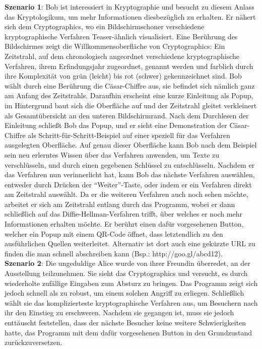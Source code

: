 \documentclass{article}
\begin{document}
\textbf{Szenario 1}:
Bob ist interessiert in Kryptographie und besucht zu diesem Anlass das Kryptologikum, um mehr Informationen diesbezüglich zu erhalten. Er nähert sich dem Cryptographics, wo ein Bildschirmschoner verschiedene kryptographische Verfahren Teaser-ähnlich visualisiert. Eine Berührung des Bildschirmes zeigt die Willkommensoberfläche von Cryptographics: Ein Zeitstrahl, auf dem chronologisch angeordnet verschiedene kryptographische Verfahren, ihrem Erfindungsjahr zugeordnet, genannt werden und farblich durch ihre Komplexität von grün (leicht) bis rot (schwer) gekennzeichnet sind. Bob wählt durch eine Berührung die Cäsar-Chiffre aus, sie befindet sich nämlich ganz am Anfang des Zeitstrahls. Daraufhin erscheint eine kurze Einleitung als Popup, im Hintergrund baut sich die Oberfläche auf und der Zeitstrahl gleitet verkleinert als Gesamtübersicht an den unteren Bildschirmrand. Nach dem Durchlesen der Einleitung schließt Bob das Popup, und er sieht eine Demonstration der Cäsar-Chiffre als Schritt-für-Schritt-Beispiel auf 
einer speziell für das Verfahren ausgelegten Oberfläche. Auf genau dieser Oberfläche kann Bob nach dem Beispiel sein neu erlerntes Wissen über das Verfahren anwenden, um Texte zu verschlüsseln, und durch einen gegebenen Schlüssel zu entschlüsseln. Nachdem er das Verfahren nun verinnerlicht hat, kann Bob das nächste Verfahren auswählen, entweder durch Drücken der “Weiter”-Taste, oder indem er ein Verfahren direkt am Zeitstrahl auswählt. Da er die weiteren Verfahren auch noch sehen möchte, arbeitet er sich am Zeitstrahl entlang durch das Programm, wobei er dann schließlich auf das Diffie-Hellman-Verfahren trifft, über welches er noch mehr Informationen erhalten möchte. Er berührt einen dafür vorgesehenen Button, welcher ein Popup mit einem QR-Code öffnet, dass letztendlich zu den ausführlichen Quellen weiterleitet. Alternativ ist dort auch eine gekürzte URL zu finden die man schnell abschreiben kann (Bsp.: http://goo.gl/abcd12).\\

\textbf{Szenario 2}:
Die ungeduldige Alice wurde von ihrer Freundin überredet, an der Ausstellung teilzunehmen. Sie sieht das Cryptographics und versucht, es durch wiederholte zufällige Eingaben zum Absturz zu bringen. Das Programm zeigt sich jedoch schnell als zu robust, um einem solchen Angriff zu erliegen. Schließlich wählt sie das komplizierteste kryptographische Verfahren aus, um Besuchern nach ihr den Einstieg zu erschweren. Nachdem sie gegangen ist, muss sie jedoch enttäuscht feststellen, dass der nächste Besucher keine weitere Schwierigkeiten hatte, das Programm mit dem dafür vorgesehenen Button in den Grundzustand zurückzuversetzen.\\
\end{document}
